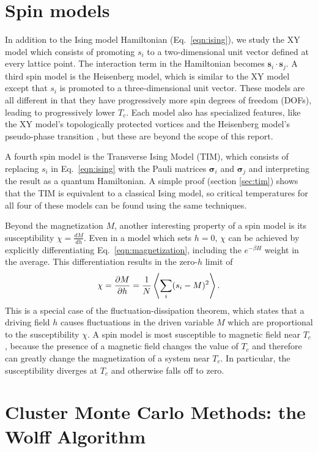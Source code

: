 \documentclass[
  amsmath,
  amssymb,
  aps,
  twocolumn,
  nofootinbib,
  nolongbibliography,
  floatfix,
]{revtex4-2}
\begin{document}
\section{Spin models}
\label{sec:spin-models}

In addition to the Ising model Hamiltonian (Eq.~\ref{eqn:ising}), we study the XY model which consists of promoting $s_i$ to a two-dimensional unit vector defined at every lattice point. The interaction term in the Hamiltonian becomes $\bm s_i \cdot \bm s_j$. A third spin model is the Heisenberg model, which is similar to the XY model except that $s_i$ is promoted to a three-dimensional unit vector. These models are all different in that they have progressively more spin degrees of freedom (DOFs), leading to progressively lower $T_c$. Each model also has specialized features, like the XY model's topologically protected vortices and the Heisenberg model's pseudo-phase transition \cite{tomita2014finite}, but these are beyond the scope of this report.

A fourth spin model is the Transverse Ising Model (TIM), which consists of replacing $s_i$ in Eq.~\ref{eqn:ising} with the Pauli matrices $\bm \sigma_i$ and $\bm \sigma_j$ and interpreting the result as a quantum Hamiltonian. A simple proof (section \ref{sec:tim}) shows that the TIM is equivalent to a classical Ising model, so critical temperatures for all four of these models can be found using the same techniques.

Beyond the magnetization $M$, another interesting property of a spin model is its susceptibility $\chi = \frac{dM}{dh}$. Even in a model which sets $h=0$, $\chi$ can be achieved by explicitly differentiating Eq.~\ref{eqn:magnetization}, including the $e^{-\beta H}$ weight in the average. This differentiation results in the zero-$h$ limit of
\begin{equation}
  \chi = \frac{\partial M}{\partial h} = \frac{1}{N}\Braket{\sum_i(s_i - M)^2}.
\end{equation}
This is a special case of the fluctuation-dissipation theorem, which states that a driving field $h$ causes fluctuations in the driven variable $M$ which are proportional to the susceptibility $\chi$. A spin model is most susceptible to magnetic field near $T_c$, because the presence of a magnetic field changes the value of $T_c$ and therefore can greatly change the magnetization of a system near $T_c$. In particular, the susceptibility diverges at $T_c$ and otherwise falls off to zero.


\section{Cluster Monte Carlo Methods: the Wolff Algorithm}
\label{sec:wolff}
\end{document}
